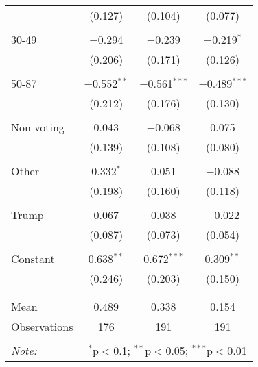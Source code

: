 \begin{tabular}{@{\extracolsep{5pt}}lccc}
  & (0.127) & (0.104) & (0.077) \\ 
  & & & \\ 
 30-49 & $-$0.294 & $-$0.239 & $-$0.219$^{*}$ \\ 
  & (0.206) & (0.171) & (0.126) \\ 
  & & & \\ 
 50-87 & $-$0.552$^{**}$ & $-$0.561$^{***}$ & $-$0.489$^{***}$ \\ 
  & (0.212) & (0.176) & (0.130) \\ 
  & & & \\ 
 Non voting & 0.043 & $-$0.068 & 0.075 \\ 
  & (0.139) & (0.108) & (0.080) \\ 
  & & & \\ 
 Other & 0.332$^{*}$ & 0.051 & $-$0.088 \\ 
  & (0.198) & (0.160) & (0.118) \\ 
  & & & \\ 
 Trump & 0.067 & 0.038 & $-$0.022 \\ 
  & (0.087) & (0.073) & (0.054) \\ 
  & & & \\ 
 Constant & 0.638$^{**}$ & 0.672$^{***}$ & 0.309$^{**}$ \\ 
  & (0.246) & (0.203) & (0.150) \\ 
  & & & \\ 
\hline \\[-1.8ex] 
Mean & 0.489 & 0.338 & 0.154 \\ 
Observations & 176 & 191 & 191 \\ 
\hline 
\hline \\[-1.8ex] 
\textit{Note:}  & \multicolumn{3}{r}{$^{*}$p$<$0.1; $^{**}$p$<$0.05; $^{***}$p$<$0.01} \\ 
\end{tabular} 
